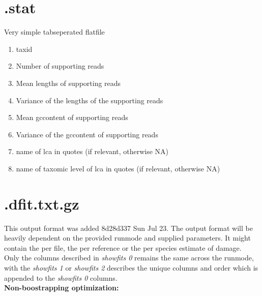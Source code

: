 \documentclass[10pt]{article}
\begin{document}
\section{.stat}\label{sec:stat}
Very simple tabseperated flatfile
\begin{enumerate}
\item taxid
\item Number of supporting reads
\item Mean lengths of supporting reads
\item Variance of the lengths of the supporting reads
\item Mean gccontent of supporting reads
\item Variance of the gccontent of supporting reads
\item name of lca in quotes (if relevant, otherwise NA)
\item name of taxomic level of lca in quotes (if relevant, otherwise NA)
\end{enumerate}
\clearpage
\section{.dfit.txt.gz}
This output format was added 8d28d337 Sun Jul 23.  
The output format will be heavily dependent on the provided runmode and supplied parameters. It might contain the
per file, the per reference or the per species estimate of damage.\\ \noindent
Only the columns described in \textit{showfits 0} remains the same across the runmode, with the \textit{showfits 1} or \textit{showfits 2} describes the unique columns and order which is appended to the \textit{showfits 0} columns.\\ \noindent
\textbf{Non-boostrapping optimization:} \\ \noindent
\end{document}
